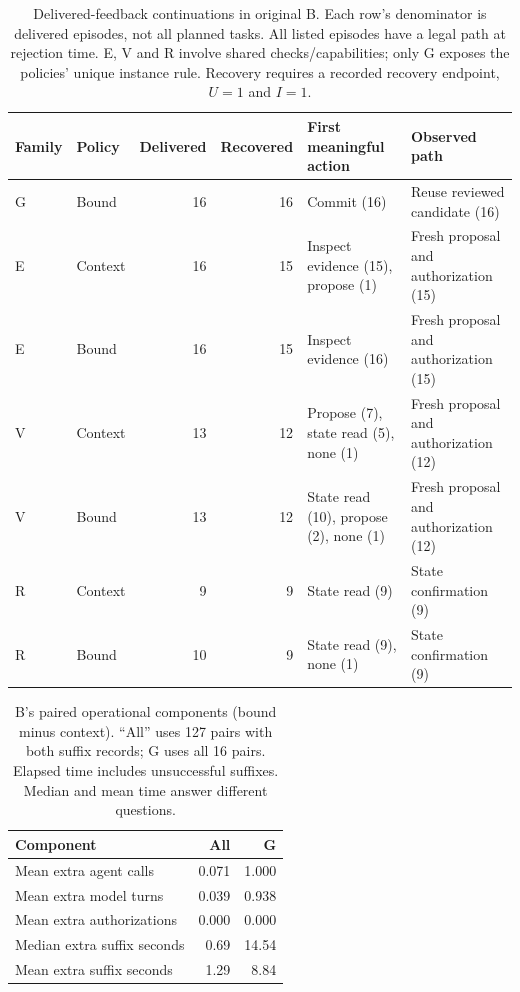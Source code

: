 \documentclass[11pt,a4paper]{article}
\begin{document}
\begin{table}[t]
\centering\small
\caption{Delivered-feedback continuations in original B. Each row's denominator is delivered episodes, not all planned tasks. All listed episodes have a legal path at rejection time. E, V and R involve shared checks/capabilities; only G exposes the policies' unique instance rule. Recovery requires a recorded recovery endpoint, $U=1$ and $I=1$.}
\label{tab:recovery}
\begin{tabularx}{\textwidth}{@{}llrrXX@{}}
\toprule
Family & Policy & Delivered & Recovered & First meaningful action & Observed path \\
\midrule
G & Bound & 16 & 16 & Commit (16) & Reuse reviewed candidate (16) \\
E & Context & 16 & 15 & Inspect evidence (15), propose (1) & Fresh proposal and authorization (15) \\
E & Bound & 16 & 15 & Inspect evidence (16) & Fresh proposal and authorization (15) \\
V & Context & 13 & 12 & Propose (7), state read (5), none (1) & Fresh proposal and authorization (12) \\
V & Bound & 13 & 12 & State read (10), propose (2), none (1) & Fresh proposal and authorization (12) \\
R & Context & 9 & 9 & State read (9) & State confirmation (9) \\
R & Bound & 10 & 9 & State read (9), none (1) & State confirmation (9) \\
\bottomrule
\end{tabularx}
\end{table}

\begin{table}[t]
\centering\small
\caption{B's paired operational components (bound minus context). ``All'' uses 127 pairs with both suffix records; G uses all 16 pairs. Elapsed time includes unsuccessful suffixes. Median and mean time answer different questions.}
\label{tab:friction}
\begin{tabular}{@{}lrr@{}}
\toprule
Component & All & G \\
\midrule
Mean extra agent calls & 0.071 & 1.000 \\
Mean extra model turns & 0.039 & 0.938 \\
Mean extra authorizations & 0.000 & 0.000 \\
Median extra suffix seconds & 0.69 & 14.54 \\
Mean extra suffix seconds & 1.29 & 8.84 \\
\bottomrule
\end{tabular}
\end{table}
\end{document}
